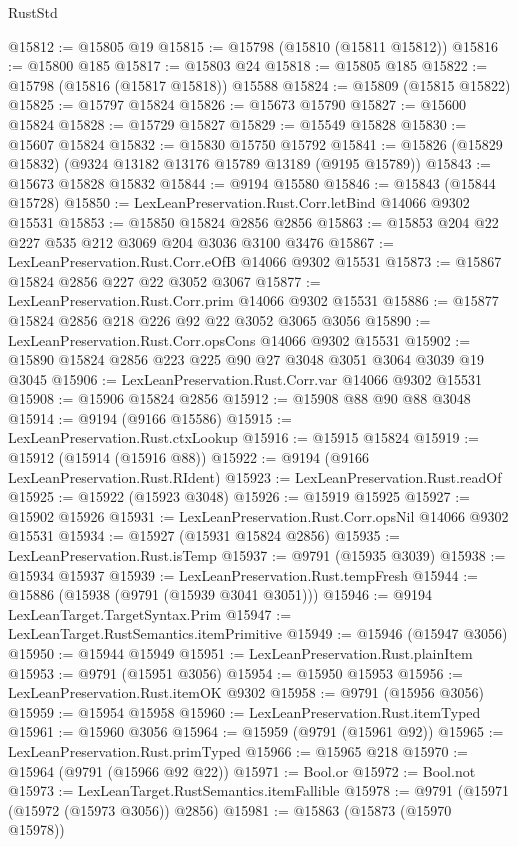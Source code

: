 \begin{lexlean}{RustStd}
\begin{coremodule}
@15812 := @15805 @19
@15815 := @15798 (@15810 (@15811 @15812))
@15816 := @15800 @185
@15817 := @15803 @24
@15818 := @15805 @185
@15822 := @15798 (@15816 (@15817 @15818)) @15588
@15824 := @15809 (@15815 @15822)
@15825 := @15797 @15824
@15826 := @15673 @15790
@15827 := @15600 @15824
@15828 := @15729 @15827
@15829 := @15549 @15828
@15830 := @15607 @15824
@15832 := @15830 @15750 @15792
@15841 := @15826 (@15829 @15832) (@9324 @13182 @13176 @15789 @13189 (@9195 @15789))
@15843 := @15673 @15828 @15832
@15844 := @9194 @15580
@15846 := @15843 (@15844 @15728)
@15850 := LexLeanPreservation.Rust.Corr.letBind @14066 @9302 @15531
@15853 := @15850 @15824 @2856 @2856
@15863 := @15853 @204 @22 @227 @535 @212 @3069 @204 @3036 @3100 @3476
@15867 := LexLeanPreservation.Rust.Corr.eOfB @14066 @9302 @15531
@15873 := @15867 @15824 @2856 @227 @22 @3052 @3067
@15877 := LexLeanPreservation.Rust.Corr.prim @14066 @9302 @15531
@15886 := @15877 @15824 @2856 @218 @226 @92 @22 @3052 @3065 @3056
@15890 := LexLeanPreservation.Rust.Corr.opsCons @14066 @9302 @15531
@15902 := @15890 @15824 @2856 @223 @225 @90 @27 @3048 @3051 @3064 @3039 @19 @3045
@15906 := LexLeanPreservation.Rust.Corr.var @14066 @9302 @15531
@15908 := @15906 @15824 @2856
@15912 := @15908 @88 @90 @88 @3048
@15914 := @9194 (@9166 @15586)
@15915 := LexLeanPreservation.Rust.ctxLookup
@15916 := @15915 @15824
@15919 := @15912 (@15914 (@15916 @88))
@15922 := @9194 (@9166 LexLeanPreservation.Rust.RIdent)
@15923 := LexLeanPreservation.Rust.readOf
@15925 := @15922 (@15923 @3048)
@15926 := @15919 @15925
@15927 := @15902 @15926
@15931 := LexLeanPreservation.Rust.Corr.opsNil @14066 @9302 @15531
@15934 := @15927 (@15931 @15824 @2856)
@15935 := LexLeanPreservation.Rust.isTemp
@15937 := @9791 (@15935 @3039)
@15938 := @15934 @15937
@15939 := LexLeanPreservation.Rust.tempFresh
@15944 := @15886 (@15938 (@9791 (@15939 @3041 @3051)))
@15946 := @9194 LexLeanTarget.TargetSyntax.Prim
@15947 := LexLeanTarget.RustSemantics.itemPrimitive
@15949 := @15946 (@15947 @3056)
@15950 := @15944 @15949
@15951 := LexLeanPreservation.Rust.plainItem
@15953 := @9791 (@15951 @3056)
@15954 := @15950 @15953
@15956 := LexLeanPreservation.Rust.itemOK @9302
@15958 := @9791 (@15956 @3056)
@15959 := @15954 @15958
@15960 := LexLeanPreservation.Rust.itemTyped
@15961 := @15960 @3056
@15964 := @15959 (@9791 (@15961 @92))
@15965 := LexLeanPreservation.Rust.primTyped
@15966 := @15965 @218
@15970 := @15964 (@9791 (@15966 @92 @22))
@15971 := Bool.or
@15972 := Bool.not
@15973 := LexLeanTarget.RustSemantics.itemFallible
@15978 := @9791 (@15971 (@15972 (@15973 @3056)) @2856)
@15981 := @15863 (@15873 (@15970 @15978))

\end{coremodule}
\end{lexlean}
